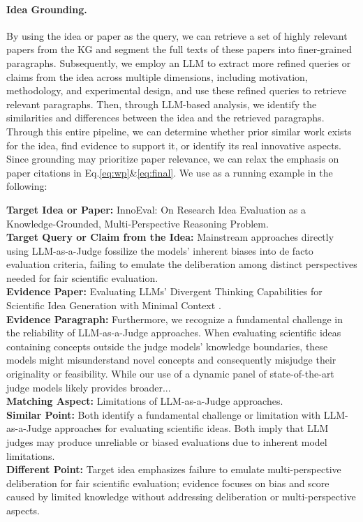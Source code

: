\documentclass{llmxive}
\begin{document}
\paragraph{Idea Grounding.}
By using the idea or paper as the query, we can retrieve a set of highly relevant papers from the KG and segment the full texts of these papers into finer-grained paragraphs.
Subsequently, we employ an LLM to extract more refined queries or claims from the idea across multiple dimensions, including motivation, methodology, and experimental design, and use these refined queries to retrieve relevant paragraphs.
Then, through LLM-based analysis, we identify the similarities and differences between the idea and the retrieved paragraphs.
Through this entire pipeline, we can determine whether prior similar work exists for the idea, find evidence to support it, or identify its real innovative aspects.
Since grounding may prioritize paper relevance, we can relax the emphasis on paper citations in Eq.\ref{eq:wp}\&\ref{eq:final}.
We use \citep{innoeval} as a running example in the following:
\begin{tcolorbox}[breakable,colback=persona!20!white, colframe=persona!60!black, title=\textbf{An Example of Idea Grounding}]
    \label{box:idea_grounding}
    \textbf{Target Idea or Paper:} InnoEval: On Research Idea Evaluation as a Knowledge-Grounded, Multi-Perspective Reasoning Problem.\\
    \textbf{Target Query or Claim from the Idea:} Mainstream approaches directly using LLM-as-a-Judge fossilize the models' inherent biases into de facto evaluation criteria, failing to emulate the deliberation among distinct perspectives needed for fair scientific evaluation.\\

    \textbf{Evidence Paper:} Evaluating LLMs' Divergent Thinking Capabilities for Scientific Idea Generation with Minimal Context \citep{divergent}.\\
    \textbf{Evidence Paragraph:} Furthermore, we recognize a fundamental challenge in the reliability of LLM-as-a-Judge approaches. When evaluating scientific ideas containing concepts outside the judge models' knowledge boundaries, these models might misunderstand novel concepts and consequently misjudge their originality or feasibility. While our use of a dynamic panel of state-of-the-art judge models likely provides broader...\\
    
    \textbf{Matching Aspect:} Limitations of LLM-as-a-Judge approaches.\\
    \textbf{Similar Point:} Both identify a fundamental challenge or limitation with LLM-as-a-Judge approaches for evaluating scientific ideas. Both imply that LLM judges may produce unreliable or biased evaluations due to inherent model limitations.\\
    \textbf{Different Point:} Target idea emphasizes failure to emulate multi-perspective deliberation for fair scientific evaluation; evidence focuses on bias and score caused by limited knowledge without addressing deliberation or multi-perspective aspects.
\end{tcolorbox}
\end{document}
